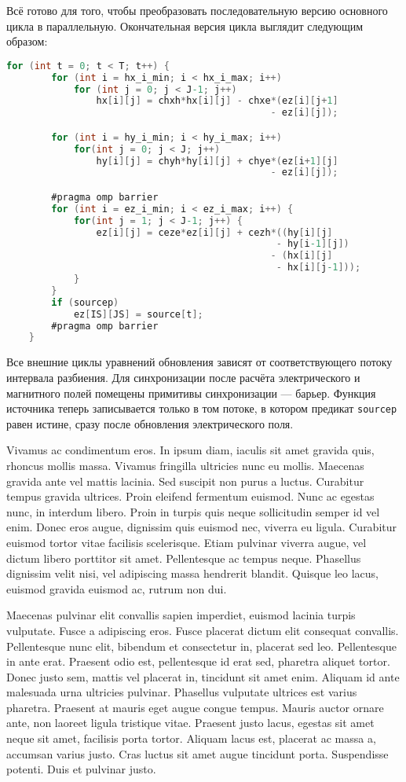 \documentclass[14pt,a4paper]{extarticle} %
\begin{document}
Всё готово для того, чтобы преобразовать последовательную версию основного цикла в параллельную. Окончательная версия цикла выглядит следующим образом:
\begin{lstlisting}[language=C]
    for (int t = 0; t < T; t++) {
        for (int i = hx_i_min; i < hx_i_max; i++)        
            for (int j = 0; j < J-1; j++) 
                hx[i][j] = chxh*hx[i][j] - chxe*(ez[i][j+1] 
                                               - ez[i][j]);

        for (int i = hy_i_min; i < hy_i_max; i++)
            for(int j = 0; j < J; j++)
                hy[i][j] = chyh*hy[i][j] + chye*(ez[i+1][j] 
                                               - ez[i][j]);

        #pragma omp barrier
        for (int i = ez_i_min; i < ez_i_max; i++) {
            for(int j = 1; j < J-1; j++) {
                ez[i][j] = ceze*ez[i][j] + cezh*((hy[i][j] 
                                                - hy[i-1][j]) 
                                               - (hx[i][j] 
                                                - hx[i][j-1]));
            }
        }
        if (sourcep)
            ez[IS][JS] = source[t];
        #pragma omp barrier
    }
\end{lstlisting}
Все внешние циклы уравнений обновления зависят от соответствующего потоку интервала разбиения. Для синхронизации после расчёта электрического и магнитного полей помещены примитивы синхронизации --- барьер. Функция источника теперь записывается только в том потоке, в котором предикат \texttt{sourcep} равен истине, сразу после обновления электрического поля.

Vivamus ac condimentum eros. In ipsum diam, iaculis sit amet gravida quis, rhoncus mollis massa. Vivamus fringilla ultricies nunc eu mollis. Maecenas gravida ante vel mattis lacinia. Sed suscipit non purus a luctus. Curabitur tempus gravida ultrices. Proin eleifend fermentum euismod. Nunc ac egestas nunc, in interdum libero. Proin in turpis quis neque sollicitudin semper id vel enim. Donec eros augue, dignissim quis euismod nec, viverra eu ligula. Curabitur euismod tortor vitae facilisis scelerisque. Etiam pulvinar viverra augue, vel dictum libero porttitor sit amet. Pellentesque ac tempus neque. Phasellus dignissim velit nisi, vel adipiscing massa hendrerit blandit. Quisque leo lacus, euismod gravida euismod ac, rutrum non dui.

Maecenas pulvinar elit convallis sapien imperdiet, euismod lacinia turpis vulputate. Fusce a adipiscing eros. Fusce placerat dictum elit consequat convallis. Pellentesque nunc elit, bibendum et consectetur in, placerat sed leo. Pellentesque in ante erat. Praesent odio est, pellentesque id erat sed, pharetra aliquet tortor. Donec justo sem, mattis vel placerat in, tincidunt sit amet enim. Aliquam id ante malesuada urna ultricies pulvinar. Phasellus vulputate ultrices est varius pharetra. Praesent at mauris eget augue congue tempus. Mauris auctor ornare ante, non laoreet ligula tristique vitae. Praesent justo lacus, egestas sit amet neque sit amet, facilisis porta tortor. Aliquam lacus est, placerat ac massa a, accumsan varius justo. Cras luctus sit amet augue tincidunt porta. Suspendisse potenti. Duis et pulvinar justo.
\end{document}
